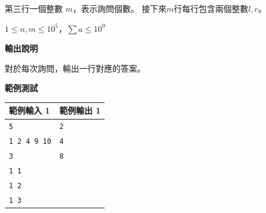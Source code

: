     第三行一個整數 $m$，表示詢問個數。
    接下來$m$行每行包含兩個整數$l,r$。

    $1\le n,m\le {10}^5$，$\sum a\le {10}^9$

    \textbf{輸出說明}

    對於每次詢問，輸出一行對應的答案。

    \textbf{範例測試}

    \begin{tabular}{|m{7cm}|m{7cm}|}
        \hline
        範例輸入 1 & 範例輸出 1 \\
        \hline
        \verb|5|  & \verb|2| \\
        \verb|1 2 4 9 10|  & \verb|4| \\
        \verb|3|  & \verb|8| \\
        \verb|1 1|  & \\
        \verb|1 2|  & \\
        \verb|1 3|  & \\
        \hline
    \end{tabular}
